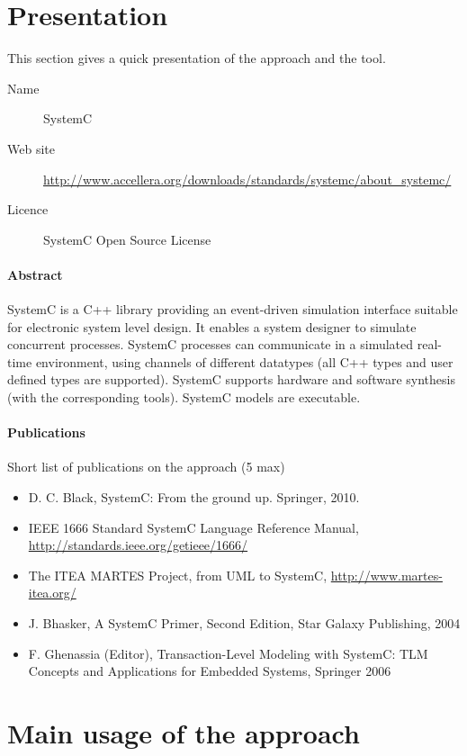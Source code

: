 \section{Presentation}

This section gives a quick presentation of the approach and the tool.

\begin{description}
\item[Name] SystemC
\item[Web site] \url{http://www.accellera.org/downloads/standards/systemc/about_systemc/}
\item[Licence] SystemC Open Source License
\end{description}

\paragraph{Abstract}

SystemC is a C++ library providing an event-driven simulation interface suitable for electronic system level design. It enables a system designer to simulate concurrent processes. SystemC processes can communicate in a simulated real-time environment, using channels of different datatypes (all C++ types and user defined types are supported). SystemC supports hardware and software synthesis (with the corresponding tools). SystemC models are executable.


\paragraph{Publications} Short list of publications on the approach (5 max)

\begin{itemize}
\item D. C. Black, SystemC: From the ground up. Springer, 2010.
\item IEEE 1666 Standard SystemC Language Reference Manual, \url{http://standards.ieee.org/getieee/1666/}
\item The ITEA MARTES Project, from UML to SystemC, \url{http://www.martes-itea.org/}
\item J. Bhasker, A SystemC Primer, Second Edition, Star Galaxy Publishing, 2004
\item F. Ghenassia (Editor), Transaction-Level Modeling with SystemC: TLM Concepts and Applications for Embedded Systems, Springer 2006
\end{itemize}

\section{Main usage of the approach}
\label{main_usage}

